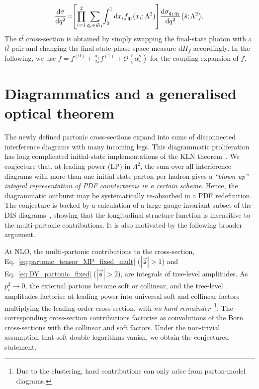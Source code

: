 \documentclass[%
 reprint,
 amsmath,amssymb,
 superscriptaddress,
 aps,
 preprintnumbers,
prl,
floatfix,
]{revtex4-2}
\let\label\latexKernelLabel
\begin{document}
\begin{equation}
\hspace{-0.05cm}\frac{\mathrm{d}\sigma}{\mathrm{d}q^2}\!=\! \! \left[\prod_{i=1}^2\sum_{\mathfrak{q}_i \in\mathfrak{S}_1}\hspace{-0.075cm}\int_0^1 \mathrm{d}x_i f_{\mathfrak{q}_i}(x_i;\Lambda ^2)\right] \!  \frac{\mathrm{d}\sigma_{\mathfrak{q}_1\mathfrak{q}_2}}{\mathrm{d}q^2} \!\left(\hat{s};\Lambda^2\right)\! .
\end{equation}
The $t\bar{t}$ cross-section is obtained by simply swapping the final-state photon with a $t\bar{t}$ pair and changing the final-state phase-space measure $\mathrm{d}\Pi_f$ accordingly. In the following, we use $f=f^{(0)}+\tfrac{\alpha_s}{2\pi}f^{(1)}+\mathcal{O}(\alpha_s^2)$ for the coupling expansion of $f$.

\section{Diagrammatics and a generalised optical theorem}
\label{sec:diagrammatics}

The newly defined partonic cross-sections expand into sums of disconnected interference diagrams with many incoming legs.
This diagrammatic proliferation has long complicated initial-state implementations of the KLN theorem~\cite{Axelrod:1985yi,Frye:2018xjj,Lavelle_2006,Capatti:2025gqj,khalil2017completediagrammaticimplementationkinoshitaleenauenberg}.
We conjecture that, at leading power (LP) in $\Lambda^2$, the sum over all interference diagrams with more than one initial-state parton per hadron gives a \emph{“blown-up” integral representation of PDF counterterms in a certain scheme}.
Hence, the diagrammatic outburst may be systematically re-absorbed in a PDF redefinition.
The conjecture is backed by a calculation of a large gauge-invariant subset of the DIS diagrams~\cite{Capatti:2025gqj}, showing that the longitudinal structure function is insensitive to the multi-partonic contributions. It is also motivated by the following broader argument.

At NLO, the multi-partonic contributions to the cross-section, Eq.~\eqref{eq:partonic_tensor_MP_fixed_mult} ($|\vec{\mathfrak{s}}|>1$) and Eq.~\eqref{eq:DY_partonic_fixed} ($|\vec{\mathfrak{s}}|>2$), are integrals of tree-level amplitudes.
As $p_i^2\to 0$, the external partons become soft or collinear, and the tree-level amplitudes factorise at leading power into universal soft and collinear factors multiplying the leading-order cross-section, with \emph{no hard remainder}~\footnote{Due to the clustering, hard contributions can only arise from parton-model diagrams.}.
The corresponding cross-section contributions factorise as convolutions of the Born cross-sections with the collinear and soft factors.
Under the non-trivial assumption that soft double logarithms vanish, we obtain the conjectured statement.
\end{document}
